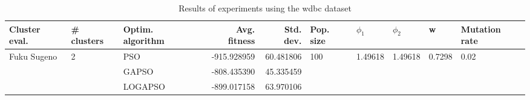 \begin{table}
\centering
\caption{Results of experiments using the wdbc dataset}
\begin{tabular}{lllrrlllll}
\toprule
               Cluster eval. &        \# clusters & Optim. algorithm &  Avg. fitness &  Std. dev. &            Pop. size &               $\phi_{1}$ &               $\phi_{2}$ &                       w &         Mutation rate \\
\midrule
\multirow{3}{*}{Fuku Sugeno} & \multirow{3}{*}{2} &              PSO &   -915.928959 &  60.481806 & \multirow{3}{*}{100} & \multirow{3}{*}{1.49618} & \multirow{3}{*}{1.49618} & \multirow{3}{*}{0.7298} & \multirow{3}{*}{0.02} \\
                             &                    &            GAPSO &   -808.435390 &  45.335459 &                      &                          &                          &                         &                       \\
                             &                    &          LOGAPSO &   -899.017158 &  63.970106 &                      &                          &                          &                         &                       \\
\bottomrule
\end{tabular}
\end{table}

